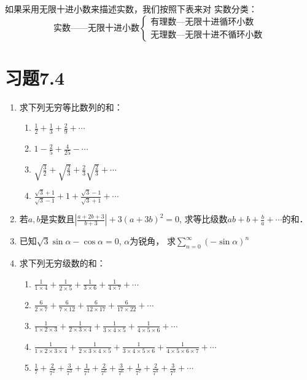 如果采用无限十进小数来描述实数，我们按照下表来对
实数分类：
\[\text{实数——无限十进小数}\begin{cases}
    \text{有理数—无限十进循环小数}\\
    \text{无理数—无限十进不循环小数}
\end{cases}\]

\section*{习题7.4}
\begin{enumerate}
    \item 求下列无穷等比数列的和：
    \begin{multicols}{2}
\begin{enumerate}
    \item $\frac{1}{2}+\frac{1}{3}+\frac{2}{9}+\cdots$
    \item $1-\frac{2}{5}+\frac{4}{25}-\cdots$
    \item $\sqrt{\frac{3}{2}}+\sqrt{\frac{2}{3}}+\frac{2}{3}\sqrt{\frac{2}{3}}+\cdots$
    \item $\frac{\sqrt{3}+1}{\sqrt{3}-1}+1+\frac{\sqrt{3}-1}{\sqrt{3}+1}+\cdots$
\end{enumerate}        
    \end{multicols}


\item 若$a,b$是实数且$\left|\frac{a+2b+3}{b+3}\right|+3(a+3b)^2=0$, 求等比级数$ab+b+\frac{b}{a}+\cdots$的和．
\item 已知$\sqrt{3}\sin\alpha-\cos\alpha=0$, $\alpha$为锐角，
求$\sum^{\infty}_{n=0}(-\sin\alpha)^n$

\item 求下列无穷级数的和：
\begin{enumerate}
\item $\frac{1}{1 \times 4}+\frac{1}{2 \times 5}+\frac{1}{3 \times 6}+\frac{1}{4 \times 7}+\cdots$
\item $\frac{6}{2 \times 7}+\frac{6}{7 \times 12}+\frac{6}{12 \times 17}+\frac{6}{17 \times 22}+\cdots$
\item $\frac{1}{1 \times 2 \times 3}+\frac{1}{2 \times 3 \times 4}+\frac{1}{3 \times 4 \times 5}+\frac{1}{4 \times 5 \times 6}+\cdots$
\item $\frac{1}{1 \times 2 \times 3 \times 4}+\frac{1}{2 \times 3 \times 4 \times 5}+\frac{1}{3 \times 4 \times 5 \times 6}+\frac{1}{4 \times 5 \times 6 \times 7}+\cdots$
\item $\frac{1}{7}+\frac{2}{7^{2}}+\frac{3}{7^{3}}+\frac{1}{7^{4}}+\frac{2}{7^{6}}+\frac{3}{7^{6}}+\frac{1}{7^{7}}+\frac{2}{7^{8}}+\frac{3}{7^{9}}+\cdots$
\end{enumerate}



\end{enumerate}
